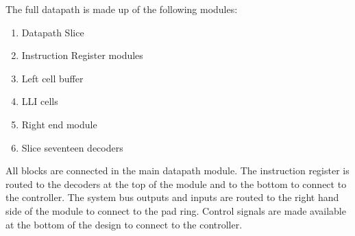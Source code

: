 The full datapath is made up of the following modules:
\begin{enumerate}
\item Datapath Slice
\item Instruction Register modules
\item Left cell buffer
\item LLI cells
\item Right end module
\item Slice seventeen decoders
\end{enumerate}

All blocks are connected in the main datapath module.
The instruction register is routed to the decoders at the top of the module and to the bottom to connect to the controller. 
The system bus outputs and inputs are routed to the right hand side of the module to connect to the pad ring.
Control signals are made available at the bottom of the design to connect to the controller. 

%

